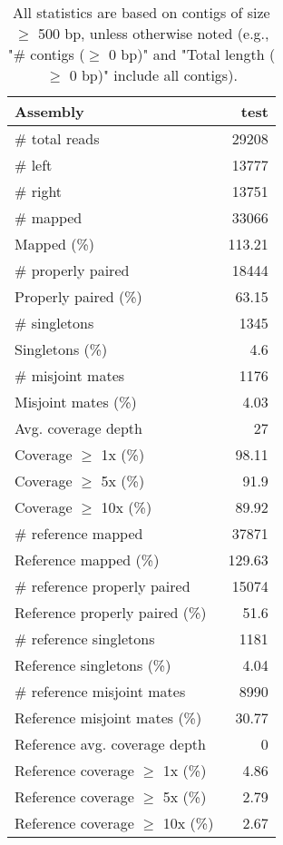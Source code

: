 \documentclass[12pt,a4paper]{article}
\begin{document}
\begin{table}[ht]
\begin{center}
\caption{All statistics are based on contigs of size $\geq$ 500 bp, unless otherwise noted (e.g., "\# contigs ($\geq$ 0 bp)" and "Total length ($\geq$ 0 bp)" include all contigs).}
\begin{tabular}{|l*{1}{|r}|}
\hline
Assembly & test \\ \hline
\# total reads & 29208 \\ \hline
\# left & 13777 \\ \hline
\# right & 13751 \\ \hline
\# mapped & 33066 \\ \hline
Mapped (\%) & 113.21 \\ \hline
\# properly paired & 18444 \\ \hline
Properly paired (\%) & 63.15 \\ \hline
\# singletons & 1345 \\ \hline
Singletons (\%) & 4.6 \\ \hline
\# misjoint mates & 1176 \\ \hline
Misjoint mates (\%) & 4.03 \\ \hline
Avg. coverage depth & 27 \\ \hline
Coverage $\geq$ 1x (\%) & 98.11 \\ \hline
Coverage $\geq$ 5x (\%) & 91.9 \\ \hline
Coverage $\geq$ 10x (\%) & 89.92 \\ \hline
\# reference mapped & 37871 \\ \hline
Reference mapped (\%) & 129.63 \\ \hline
\# reference properly paired & 15074 \\ \hline
Reference properly paired (\%) & 51.6 \\ \hline
\# reference singletons & 1181 \\ \hline
Reference singletons (\%) & 4.04 \\ \hline
\# reference misjoint mates & 8990 \\ \hline
Reference misjoint mates (\%) & 30.77 \\ \hline
Reference avg. coverage depth & 0 \\ \hline
Reference coverage $\geq$ 1x (\%) & 4.86 \\ \hline
Reference coverage $\geq$ 5x (\%) & 2.79 \\ \hline
Reference coverage $\geq$ 10x (\%) & 2.67 \\ \hline
\end{tabular}
\end{center}
\end{table}
\end{document}
